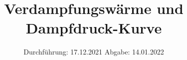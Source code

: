 

\subject{VERSUCH Nr. 203}
\title{Verdampfungswärme und Dampfdruck-Kurve}
\date{%
  Durchführung: 17.12.2021
  \hspace{3em}
  Abgabe: 14.01.2022
}



\maketitle
\thispagestyle{empty}
\tableofcontents
\newpage








\printbibliography{}


